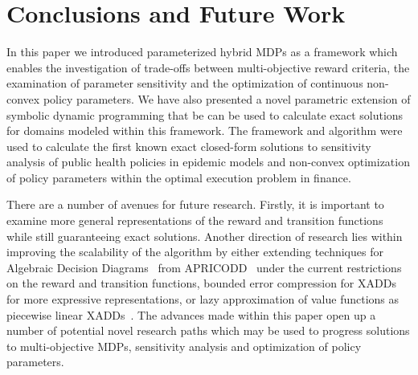\section{Conclusions and Future Work}
\label{sec:conclusion}

In this paper we introduced parameterized hybrid MDPs as a framework which enables the investigation of trade-offs between multi-objective reward criteria, the examination of parameter sensitivity and the optimization of continuous non-convex policy parameters. We have also presented a novel parametric extension of symbolic dynamic programming that be can be used to calculate exact solutions for domains modeled within this framework. The framework and algorithm were used to calculate the first known exact closed-form solutions to sensitivity analysis of public health policies in epidemic models and non-convex optimization of policy parameters within the optimal execution problem in finance.

There are a number of avenues for future research. Firstly, it is important to examine more general representations of the reward and transition functions while still guaranteeing exact solutions. Another direction of research lies within improving the scalability of the algorithm by either extending techniques for Algebraic Decision Diagrams~\parencite{Bahar_JoFMiSD_1993} from APRICODD~\parencite{St-Aubin_NIPS_2000} under the current restrictions on the reward and transition functions, bounded error compression for 
XADDs~\parencite{Vianna_UAI_2013} for more expressive representations, or lazy approximation of value functions as piecewise linear XADDs~\parencite{Li_AAAI_2005}. The advances made within this paper open up a number of potential novel research paths which may be used to progress solutions to multi-objective MDPs, sensitivity analysis and optimization of policy parameters.